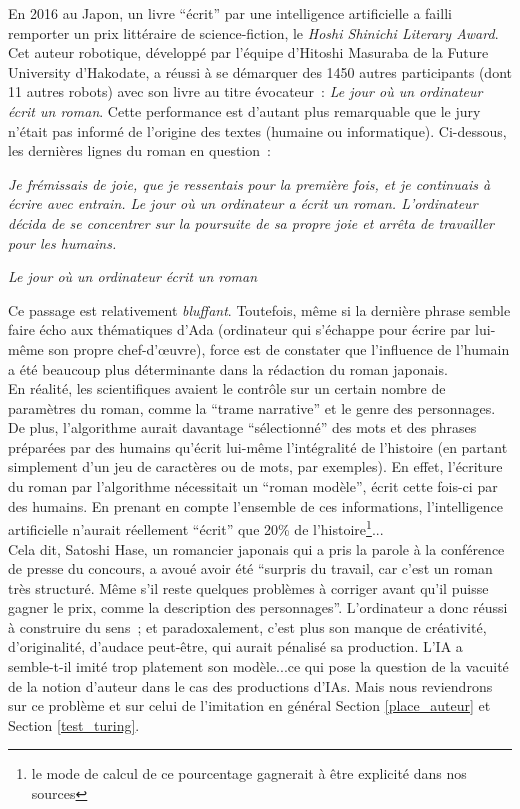 \documentclass{article}
\newenvironment{citationbox}
{\begin{center}
		\begin{minipage}{.8\textwidth}
		}
		{
		\end{minipage}	
\end{center}
}
\begin{document}
					En 2016 au Japon, un livre ``écrit'' par une intelligence artificielle a failli remporter un prix littéraire de science-fiction, le \textit{Hoshi Shinichi Literary Award}. Cet auteur robotique, développé par l'équipe d'Hitoshi Masuraba de la Future University d'Hakodate, a réussi à se démarquer des 1450 autres participants (dont 11 autres robots) avec son livre au titre évocateur~: \textit{Le jour où un ordinateur écrit un roman}. Cette performance est d'autant plus remarquable que le jury n'était pas informé de l'origine des textes (humaine ou informatique). Ci-dessous, les dernières lignes du roman en question~:
					\begin{citationbox}
						\textit{Je frémissais de joie, que je ressentais pour la première fois, et je continuais à écrire avec entrain. Le jour où un ordinateur a écrit un roman. L'ordinateur décida de se concentrer sur la poursuite de sa propre joie et arrêta de travailler pour les humains.}
						\begin{flushright}
							\textit{Le jour où un ordinateur écrit un roman}
						\end{flushright}
					\end{citationbox}
					Ce passage est relativement \textit{bluffant}. Toutefois, même si la dernière phrase semble faire écho aux thématiques d'Ada (ordinateur qui s'échappe pour écrire par lui-même son propre chef-d'œuvre), force est de constater que l'influence de l'humain a été beaucoup plus déterminante dans la rédaction du roman japonais.\\
					En réalité, les scientifiques avaient le contrôle sur un certain nombre de paramètres du roman, comme la ``trame narrative'' et le genre des personnages. De plus, l'algorithme aurait davantage ``sélectionné'' des mots et des phrases préparées par des humains qu'écrit lui-même l'intégralité de l'histoire (en partant simplement d'un jeu de caractères ou de mots, par exemples). En effet, l'écriture du roman par l'algorithme nécessitait un ``roman modèle'', écrit cette fois-ci par des humains. En prenant en compte l'ensemble de ces informations, l'intelligence artificielle n'aurait réellement ``écrit'' que 20\% de l'histoire\footnote{le mode de calcul de ce pourcentage gagnerait à être explicité dans nos sources}...\\
					
					Cela dit, Satoshi Hase, un romancier japonais qui a pris la parole à la conférence de presse du concours, a avoué avoir été ``surpris du travail, car c'est un roman très structuré. Même s'il reste quelques problèmes à corriger avant qu'il puisse gagner le prix, comme la description des personnages''. L'ordinateur a donc réussi à construire du sens ; et paradoxalement, c'est plus son manque de créativité, d'originalité, d'audace peut-être, qui aurait pénalisé sa production. L'IA a  semble-t-il imité trop platement son modèle...ce qui pose la question de la vacuité de la notion d'auteur dans le cas des productions d'IAs. Mais nous reviendrons sur ce problème et sur celui de l'imitation en général Section \ref{place_auteur} et Section \ref{test_turing}.\\
					
\end{document}
